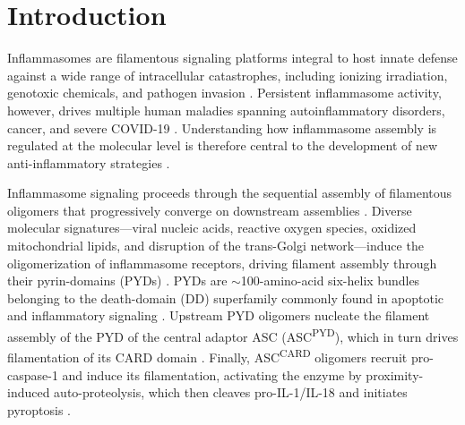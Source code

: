 \documentclass[11pt]{article}
\begin{document}
\section{Introduction}
Inflammasomes are filamentous signaling platforms integral to host innate defense against a wide range of intracellular catastrophes, including ionizing irradiation, genotoxic chemicals, and pathogen invasion \citep{brozdixit2016,zheng2020}. Persistent inflammasome activity, however, drives multiple human maladies spanning autoinflammatory disorders, cancer, and severe COVID-19 \citep{karki2017,tartey2020,vora2021}. Understanding how inflammasome assembly is regulated at the molecular level is therefore central to the development of new anti-inflammatory strategies \citep{brozdixit2016,karki2017,tartey2020,vora2021,zheng2020}.

Inflammasome signaling proceeds through the sequential assembly of filamentous oligomers that progressively converge on downstream assemblies \citep{brozdixit2016,kagan2014,luwu2015,zheng2020}. Diverse molecular signatures---viral nucleic acids, reactive oxygen species, oxidized mitochondrial lipids, and disruption of the trans-Golgi network---induce the oligomerization of inflammasome receptors, driving filament assembly through their pyrin-domains (PYDs) \citep{andreeva2021,fernandes2009,hornung2009,iyer2013,roberts2009,zhong2013}. PYDs are $\sim$100-amino-acid six-helix bundles belonging to the death-domain (DD) superfamily commonly found in apoptotic and inflammatory signaling \citep{park2007}. Upstream PYD oligomers nucleate the filament assembly of the PYD of the central adaptor ASC (ASC\textsuperscript{PYD}), which in turn drives filamentation of its CARD domain \citep{brozdixit2016,kagan2014,lu2014,luwu2015}. Finally, ASC\textsuperscript{CARD} oligomers recruit pro-caspase-1 and induce its filamentation, activating the enzyme by proximity-induced auto-proteolysis, which then cleaves pro-IL-1\textbeta/IL-18 and initiates pyroptosis \citep{brozdixit2016,kagan2014,lu2014,luwu2015}.
\end{document}
